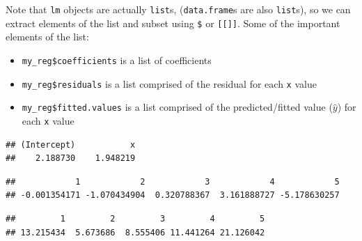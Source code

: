 \documentclass[]{book}
\newenvironment{Shaded}{\begin{snugshade}}{\end{snugshade}}
\newcommand{\DecValTok}[1]{\textcolor[rgb]{0.00,0.00,0.81}{#1}}
\newcommand{\CommentTok}[1]{\textcolor[rgb]{0.56,0.35,0.01}{\textit{#1}}}
\newcommand{\OperatorTok}[1]{\textcolor[rgb]{0.81,0.36,0.00}{\textbf{#1}}}
\newcommand{\NormalTok}[1]{#1}
\providecommand{\tightlist}{%
  \setlength{\itemsep}{0pt}\setlength{\parskip}{0pt}}
\theoremstyle{definition}
\theoremstyle{definition}
\theoremstyle{definition}
\theoremstyle{remark}
\begin{document}
Note that \texttt{lm} objects are actually \texttt{list}s,
(\texttt{data.frame}s are also \texttt{list}s), so we can extract
elements of the list and subset using \texttt{\$} or
\texttt{{[}{[}{]}{]}}. Some of the important elements of the list:

\begin{itemize}
\tightlist
\item
  \texttt{my\_reg\$coefficients} is a list of coefficients
\item
  \texttt{my\_reg\$residuals} is a list comprised of the residual for
  each \texttt{x} value
\item
  \texttt{my\_reg\$fitted.values} is a list comprised of the
  predicted/fitted value (\(\hat{y}\)) for each \texttt{x} value
\end{itemize}

\begin{Shaded}
\end{Shaded}

\begin{verbatim}
## (Intercept)           x 
##    2.188730    1.948219
\end{verbatim}

\begin{Shaded}
\end{Shaded}

\begin{verbatim}
##            1            2            3            4            5 
## -0.001354171 -1.070434904  0.320788367  3.161888727 -5.178630257
\end{verbatim}

\begin{Shaded}
\end{Shaded}

\begin{verbatim}
##         1         2         3         4         5 
## 13.215434  5.673686  8.555406 11.441264 21.126042
\end{verbatim}
\end{document}

